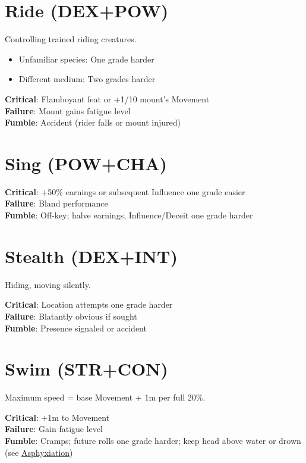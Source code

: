 \documentclass[10pt]{article}
\begin{document}
\section{Ride (DEX+POW)}
\label{skill:ride}

Controlling trained riding creatures.

\begin{itemize}
    \item Unfamiliar species: One grade harder
    \item Different medium: Two grades harder
\end{itemize}

\textbf{Critical}: Flamboyant feat or +1/10 mount's Movement\\
\textbf{Failure}: Mount gains fatigue level\\
\textbf{Fumble}: Accident (rider falls or mount injured)

\section{Sing (POW+CHA)}
\label{skill:sing}

\textbf{Critical}: +50\% earnings or subsequent Influence one grade easier\\
\textbf{Failure}: Bland performance\\
\textbf{Fumble}: Off-key; halve earnings, Influence/Deceit one grade harder

\section{Stealth (DEX+INT)}
\label{skill:stealth}

Hiding, moving silently.

\textbf{Critical}: Location attempts one grade harder\\
\textbf{Failure}: Blatantly obvious if sought\\
\textbf{Fumble}: Presence signaled or accident

\section{Swim (STR+CON)}
\label{skill:swim}

Maximum speed = base Movement + 1m per full 20\%.

\textbf{Critical}: +1m to Movement\\
\textbf{Failure}: Gain fatigue level\\
\textbf{Fumble}: Cramps; future rolls one grade harder; keep head above water or drown (see \hyperref[sec:asphyxiation]{Asphyxiation})
\end{document}
